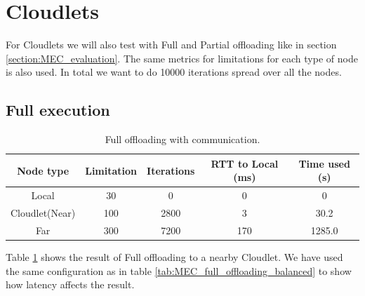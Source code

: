 














\section{Cloudlets}
For Cloudlets we will also test with Full and Partial offloading like in section \ref{section:MEC_evaluation}. The same metrics for limitations for each type of node is also used. In total we want to do 10000 iterations spread over all the nodes.

\subsection{Full execution}
\begin{table}[h!]
    \centering
    \begin{tabular}[c]{|c|c|c|c|c|}
        \hline
        Node type & Limitation & Iterations & RTT to Local (ms)& Time used (s)\\
        \hline
        \hline
        Local           & 30 & 0 & 0 & 0  \\
        \hline
        Cloudlet(Near)  & 100 & 2800 & 3 & 30.2 \\
        \hline
        Far             & 300 & 7200 & 170 & 1285.0 \\
        \hline
    \end{tabular}
    \caption{Full offloading with communication.}
    \label{tab:Cloudlet_full_offloading_latency}
\end{table}
Table \ref{tab:Cloudlet_full_offloading_latency} shows the result of Full offloading to a nearby Cloudlet. We have used the same configuration as in table \ref{tab:MEC_full_offloading_balanced} to show how latency affects the result. 

